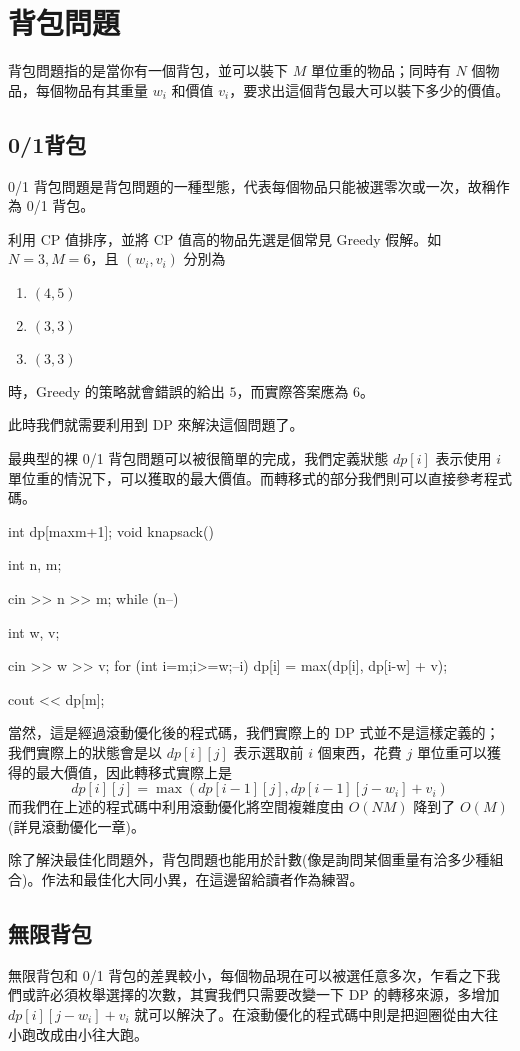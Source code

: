 \documentclass[main.tex]{subfiles}
\begin{document}
    
\section{背包問題}
    背包問題指的是當你有一個背包，並可以裝下 $M$ 單位重的物品；同時有 $N$ 個物品，每個物品有其重量 $w_i$ 和價值 $v_i$，要求出這個背包最大可以裝下多少的價值。
    \subsection{0/1背包}
        0/1 背包問題是背包問題的一種型態，代表每個物品只能被選零次或一次，故稱作為 0/1 背包。
        
        利用 CP 值排序，並將 CP 值高的物品先選是個常見 Greedy 假解。如 $N = 3, M = 6$，且 $(w_i, v_i)$ 分別為
        \begin{enumerate}
            \item $(4, 5)$
            \item $(3, 3)$
            \item $(3, 3)$
        \end{enumerate}
        時，Greedy 的策略就會錯誤的給出 $5$，而實際答案應為 $6$。
        
        此時我們就需要利用到 DP 來解決這個問題了。
        
        最典型的裸 0/1 背包問題可以被很簡單的完成，我們定義狀態 $dp[i]$ 表示使用 $i$ 單位重的情況下，可以獲取的最大價值。而轉移式的部分我們則可以直接參考程式碼。
        
        \begin{C++}
int dp[maxm+1];
void knapsack(){
    int n, m;
    
    cin >> n >> m;
    while (n--){
        int w, v;
        
        cin >> w >> v;
        for (int i=m;i>=w;--i)
            dp[i] = max(dp[i], dp[i-w] + v);
    }
    cout << dp[m];
}
        \end{C++}
        
        當然，這是經過滾動優化後的程式碼，我們實際上的 DP 式並不是這樣定義的；我們實際上的狀態會是以 $dp[i][j]$ 表示選取前 $i$ 個東西，花費 $j$ 單位重可以獲得的最大價值，因此轉移式實際上是 $$dp[i][j] = \max(dp[i-1][j], dp[i-1][j-w_i] + v_i)$$
        而我們在上述的程式碼中利用滾動優化將空間複雜度由 $O(NM)$ 降到了 $O(M)$ (詳見滾動優化一章)。
        
        除了解決最佳化問題外，背包問題也能用於計數(像是詢問某個重量有洽多少種組合)。作法和最佳化大同小異，在這邊留給讀者作為練習。
        
    \subsection{無限背包}
        無限背包和 0/1 背包的差異較小，每個物品現在可以被選任意多次，乍看之下我們或許必須枚舉選擇的次數，其實我們只需要改變一下 DP 的轉移來源，多增加 $dp[i][j-w_i] + v_i$ 就可以解決了。在滾動優化的程式碼中則是把迴圈從由大往小跑改成由小往大跑。
\end{document}
